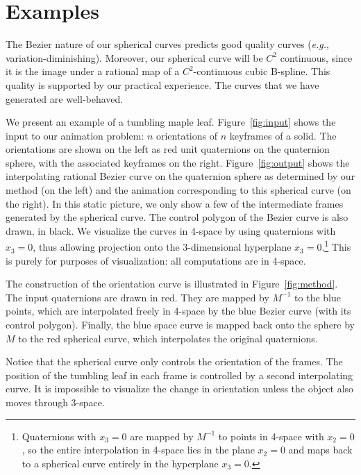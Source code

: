 \section{Examples}
\label{sec:eg}

The Bezier nature of our spherical curves predicts good quality curves
({\em e.g.}, variation-diminishing).
Moreover, our spherical curve will be $C^2$ continuous, since it is the image
under a rational map of a $C^2$-continuous cubic B-spline.
This quality is supported by our practical experience.
The curves that we have generated are well-behaved.

We present an example of a tumbling maple leaf.
Figure~\ref{fig:input} shows the input to our animation problem:
$n$ orientations of $n$ keyframes of a solid.
The orientations are shown on the left as red unit quaternions
on the quaternion sphere, with the associated keyframes on the right.
Figure~\ref{fig:output} shows the interpolating rational Bezier curve
on the quaternion sphere as determined by our method (on the left)
and the animation corresponding to this spherical curve (on the right).
In this static picture, we only show a few of the intermediate frames
generated by the spherical curve.
The control polygon of the Bezier curve is also drawn, in black.
We visualize the curves in 4-space by using quaternions with $x_3=0$,
thus allowing projection onto the 3-dimensional hyperplane 
$x_3=0$.\footnote{Quaternions with $x_3=0$ are mapped by $M^{-1}$ to points
	in 4-space with $x_2=0$, so the entire interpolation in 4-space
	lies in the plane $x_2=0$ and maps back to a spherical curve
	entirely in the hyperplane $x_3=0$.}
This is purely for purposes of visualization: all computations
are in 4-space.

The construction of the orientation curve is illustrated in
Figure~\ref{fig:method}.
The input quaternions are drawn in red.
They are mapped by $M^{-1}$ to the blue points, which are interpolated
freely in 4-space by the blue Bezier curve (with its control polygon).
Finally, the blue space curve is mapped back onto the sphere by $M$
to the red spherical curve, which interpolates the original quaternions.

Notice that the spherical curve only controls the orientation of the frames.
The position of the tumbling leaf in
each frame is controlled by a second interpolating curve.
It is impossible to visualize the change in orientation unless
the object also moves through 3-space.

